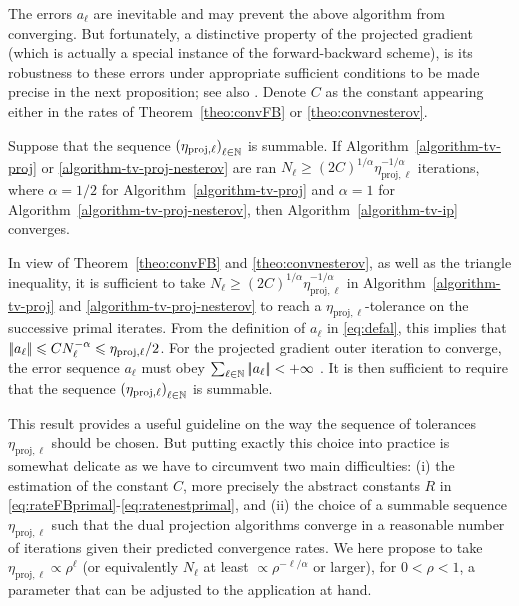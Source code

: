 \documentclass[11pt,nofonttune,a4paper]{IEEEtran}
\newcommand{\tol}{\eta}
\begin{document}
The errors $a_\ell$ are inevitable and may prevent the above algorithm from converging. But fortunately, a distinctive property of the projected gradient (which is actually a special instance of the forward-backward scheme), is its robustness to these errors under appropriate sufficient conditions to be made precise in the next proposition; see also \cite{combettes-monotone-inclusions,combettes-splitting}. Denote $C$ as the constant appearing either in the rates of Theorem~\ref{theo:convFB} or \ref{theo:convnesterov}.

\begin{prop}
\label{prop:convtolFB}
Suppose that the sequence $\pa{\tol_{\text{proj},\ell}}_{\ell \in \NN}$ is summable. If Algorithm~\ref{algorithm-tv-proj} or \ref{algorithm-tv-proj-nesterov} are ran $N_\ell \geq (2C)^{1/\alpha} \tol_{\text{proj},\ell}^{-1/\alpha}$ iterations, where $\alpha=1/2$ for Algorithm~\ref{algorithm-tv-proj} and $\alpha=1$ for Algorithm~\ref{algorithm-tv-proj-nesterov}, then Algorithm~\ref{algorithm-tv-ip} converges.
\end{prop}

\begin{IEEEproof}
In view of Theorem~\ref{theo:convFB} and \ref{theo:convnesterov}, as well as the triangle inequality, it is sufficient to take $N_\ell \geq (2C)^{1/\alpha} \tol_{\text{proj},\ell}^{-1/\alpha}$ in Algorithm~\ref{algorithm-tv-proj} and \ref{algorithm-tv-proj-nesterov} to reach a $\tol_{\text{proj},\ell}$-tolerance on the successive primal iterates. From the definition of $a_\ell$ in \eqref{eq:defal}, this implies that $\norm{a_\ell} \leq C N_\ell^{-\alpha} \leq \tol_{\text{proj},\ell}/2$. For the projected gradient outer iteration to converge, the error sequence $a_\ell$ must obey $\sum_{\ell \in \mathbb{N}} |\!| a_\ell |\!| < +\infty$ \cite{combettes-monotone-inclusions,combettes-splitting}. It is then sufficient to require that the sequence $\pa{\tol_{\text{proj},\ell}}_{\ell \in \NN}$ is summable.
\end{IEEEproof}

This result provides a useful guideline on the way the sequence of tolerances $\tol_{\text{proj},\ell}$ should be chosen. But putting exactly this choice into practice is somewhat delicate as we have to circumvent two main difficulties: (i) the estimation of the constant $C$, more precisely the abstract constants $R$ in \eqref{eq:rateFBprimal}-\eqref{eq:ratenestprimal}, and (ii) the choice of a summable sequence $\tol_{\text{proj},\ell}$ such that the dual projection algorithms converge in a reasonable number of iterations given their predicted convergence rates. We here propose to take $\tol_{\text{proj},\ell} \propto \rho^{\ell}$ (or equivalently $N_\ell$ at least $\propto \rho^{-\ell/\alpha}$ or larger), for $0 < \rho < 1$, a parameter that can be adjusted to the application at hand.
\end{document}
